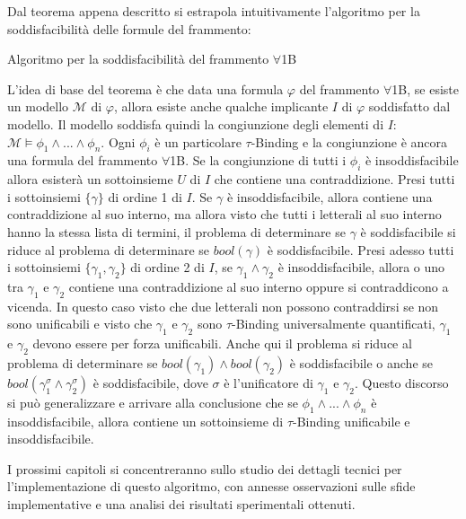 \documentclass[./main.tex]{subfiles}
\begin{document}
Dal teorema appena descritto si estrapola intuitivamente l'algoritmo per la soddisfacibilità delle formule del frammento:

\begin{algorithm}[H]
    \caption{Algoritmo per la soddisfacibilità del frammento $\forall$1B} \label{alg:1b}
  

    \Return{$\bot$}
  \end{algorithm}

L'idea di base del teorema è che data una formula $\varphi$ del frammento $\forall$1B,
se esiste un modello $\mathcal{M}$ di $\varphi$, allora esiste anche qualche implicante $I$ di $\varphi$ soddisfatto dal modello.
Il modello soddisfa quindi la congiunzione degli elementi di $I$: $\mathcal{M} \models \phi_1 \land ... \land \phi_n$.
Ogni $\phi_i$ è un particolare $\tau$-Binding e la congiunzione è ancora una formula del frammento $\forall$1B. 
Se la congiunzione di tutti i $\phi_i$ è insoddisfacibile allora 
esisterà un sottoinsieme $U$ di $I$ che contiene una contraddizione.
Presi tutti i sottoinsiemi $\{\gamma\}$ di ordine 1 di $I$. 
Se $\gamma$ è insoddisfacibile, allora contiene una contraddizione al suo interno, ma allora visto che tutti i letterali
al suo interno hanno la stessa lista di termini, il problema di determinare se $\gamma$ è soddisfacibile si riduce al problema
di determinare se $bool(\gamma)$ è soddisfacibile.
Presi adesso tutti i sottoinsiemi $\{\gamma_1, \gamma_2\}$ di ordine 2 di $I$,
se $\gamma_1 \land \gamma_2$ è insoddisfacibile, allora o uno tra $\gamma_1$ e $\gamma_2$ contiene una contraddizione al suo interno oppure 
si contraddicono a vicenda. 
In questo caso visto che due letterali non possono contraddirsi se non sono unificabili
e visto che $\gamma_1$ e $\gamma_2$ sono $\tau$-Binding universalmente quantificati, $\gamma_1$ e $\gamma_2$ devono essere per forza unificabili.
Anche qui il problema si riduce al problema di determinare se $bool(\gamma_1) \land bool(\gamma_2)$ è soddisfacibile 
o anche se $bool(\gamma_1^\sigma \land \gamma_2^\sigma)$ è soddisfacibile, dove $\sigma$ è l'unificatore di $\gamma_1$ e $\gamma_2$.
Questo discorso si può generalizzare e arrivare alla conclusione che se $\phi_1 \land ... \land \phi_n$ è insoddisfacibile, allora
contiene un sottoinsieme di $\tau$-Binding unificabile e insoddisfacibile.

I prossimi capitoli si concentreranno sullo studio dei dettagli tecnici per l'implementazione di questo algoritmo,
con annesse osservazioni sulle sfide implementative e una analisi dei risultati sperimentali ottenuti.
\end{document}
